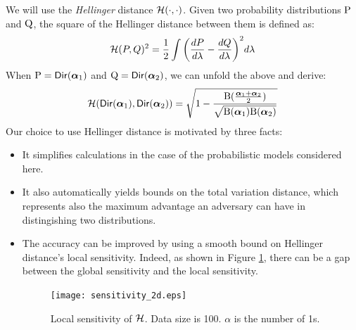 \documentclass{article}
\begin{document}
We will use the \emph{Hellinger} distance $\mathcal{H}(\cdot,\cdot)$.
Given two probability distributions $\textup{P}$ and $\textup{Q}$,
the square of the Hellinger distance between them is defined as:
\[
\mathcal{H}(P,Q)^2 =\frac{1}{2} \int \bigg(\frac{dP}{d \lambda} - \frac{dQ}{d \lambda}\bigg)^2 d \lambda
\]
When $\textup{P}=\mathsf{Dir}(\boldsymbol{\alpha}_1)$ and $\textup{Q}=\mathsf{Dir}(\boldsymbol{\alpha}_2)$, we can unfold the above and derive: 
 \[
   \mathcal{H}(\mathsf{Dir}(\boldsymbol{\alpha}_1), \mathsf{Dir}(\boldsymbol{\alpha}_2)) = \sqrt{1 - \frac{\textup{B}(\frac{\boldsymbol{\alpha}_1 + \boldsymbol{\alpha}_2}{2})}{\sqrt{\textup{B}(\boldsymbol{\alpha}_1) \textup{B}(\boldsymbol{\alpha}_2)}}}
 \]
Our choice to use Hellinger distance is motivated by three facts:
\begin{itemize}
  \item It simplifies calculations in the case of the probabilistic models considered here.
  
  \item It also automatically yields bounds on the total variation distance, which represents also the maximum advantage an adversary can have in distingishing two distributions. 

  \item The accuracy can be improved by using a smooth bound on Hellinger distance's local sensitivity. Indeed, as shown in Figure \ref{fig_sensitivity}, there can be a gap
    between the global sensitivity and the local sensitivity.
\begin{figure}[ht]
\centering
\texttt{[image: sensitivity\_2d.eps]}
\caption{Local sensitivity of $\mathcal{H}$. Data size is 100. $\alpha$ is the number of 1s.}
\label{fig_sensitivity}
\end{figure}
\end{itemize}
\end{document}
